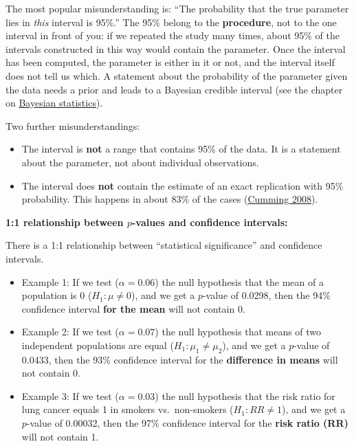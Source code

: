 \documentclass[
]{book}
\providecommand{\tightlist}{%
  \setlength{\itemsep}{0pt}\setlength{\parskip}{0pt}}
\begin{document}
The most popular misunderstanding is: ``The probability that the true parameter lies in \emph{this} interval is 95\%.''
The 95\% belong to the \textbf{procedure}, not to the one interval in front of you: if we repeated the study many times,
about 95\% of the intervals constructed in this way would contain the parameter.
Once the interval has been computed, the parameter is either in it or not, and the interval itself does not tell us which.
A statement about the probability of the parameter given the data needs a prior and leads to a
Bayesian credible interval (see the chapter on \hyperref[bayes_statistics]{Bayesian statistics}).

Two further misunderstandings:

\begin{itemize}
\tightlist
\item
  The interval is \textbf{not} a range that contains 95\% of the data. It is a statement about the parameter, not about individual observations.
\item
  The interval does \textbf{not} contain the estimate of an exact replication with 95\% probability.
  This happens in about 83\% of the cases (\href{https://doi.org/10.1111/j.1745-6924.2008.00079.x}{Cumming 2008}).
\end{itemize}

\textbf{1:1 relationship between \(p\)-values and confidence intervals:}

There is a 1:1 relationship between ``statistical significance'' and confidence intervals.

\begin{itemize}
\item
  Example 1: If we test (\(\alpha = 0.06\)) the null hypothesis that the mean of a population
  is 0 (\(H_1: \mu \ne 0\)),
  and we get a \(p\)-value of 0.0298, then the 94\% confidence interval \textbf{for the mean}
  will not contain 0.
\item
  Example 2: If we test (\(\alpha = 0.07\)) the null hypothesis that means of two independent
  populations are equal (\(H_1: \mu_1 \ne \mu_2\)), and we get a \(p\)-value of 0.0433,
  then the 93\% confidence interval for the \textbf{difference in means} will not contain 0.
\item
  Example 3: If we test (\(\alpha = 0.03\)) the null hypothesis that the risk ratio for
  lung cancer equals 1 in smokers vs.~non-smokers (\(H_1: RR \ne 1\)), and we get a
  \(p\)-value of 0.00032, then the 97\% confidence interval for the \textbf{risk ratio (RR)}
  will not contain 1.
\end{itemize}
\end{document}
